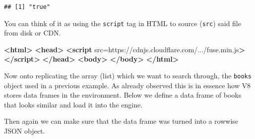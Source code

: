 \documentclass[
]{krantz}
\makeatletter
\newenvironment{Shaded}{\begin{snugshade}}{\end{snugshade}}
\newcommand{\DataTypeTok}[1]{\textcolor[rgb]{0.27,0.27,0.27}{#1}}
\newcommand{\KeywordTok}[1]{\textcolor[rgb]{0.27,0.27,0.27}{\textbf{#1}}}
\newcommand{\NormalTok}[1]{#1}
\newcommand{\OperatorTok}[1]{\textcolor[rgb]{0.43,0.43,0.43}{\textbf{#1}}}
\newcommand{\OtherTok}[1]{\textcolor[rgb]{0.37,0.37,0.37}{#1}}
\newcommand{\StringTok}[1]{\textcolor[rgb]{0.5,0.5,0.5}{#1}}
\newenvironment{kframe}{%
\medskip{}
\setlength{\fboxsep}{.8em}
 \def\at@end@of@kframe{}%
 \ifinner\ifhmode%
  \def\at@end@of@kframe{\end{minipage}}%
  \begin{minipage}{\columnwidth}%
 \fi\fi%
 \def\FrameCommand##1{\hskip\@totalleftmargin \hskip-\fboxsep
 \colorbox{shadecolor}{##1}\hskip-\fboxsep
     \hskip-\linewidth \hskip-\@totalleftmargin \hskip\columnwidth}%
 \MakeFramed {\advance\hsize-\width
   \@totalleftmargin\z@ \linewidth\hsize
   \@setminipage}}%
 {\par\unskip\endMakeFramed%
 \at@end@of@kframe}
\renewenvironment{Shaded}{\begin{kframe}}{\end{kframe}}
\makeatother
\begin{document}
\begin{verbatim}
## [1] "true"
\end{verbatim}

You can think of it as using the \texttt{script} tag in HTML to source (\texttt{src}) said file from disk or CDN.

\begin{Shaded}
\begin{Highlighting}[]
\KeywordTok{\textless{}html\textgreater{}}
  \KeywordTok{\textless{}head\textgreater{}}
    \KeywordTok{\textless{}script} 
\OtherTok{      src=}\StringTok{\textquotesingle{}https://cdnjs.cloudflare.com/.../fuse.min.js\textquotesingle{}}\KeywordTok{\textgreater{}}
    \KeywordTok{\textless{}/script\textgreater{}}
  \KeywordTok{\textless{}/head\textgreater{}}
  \KeywordTok{\textless{}body\textgreater{}}
  \KeywordTok{\textless{}/body\textgreater{}}
\KeywordTok{\textless{}/html\textgreater{}}
\end{Highlighting}
\end{Shaded}

Now onto replicating the array (list) which we want to search through, the \texttt{books} object used in a previous example. As already observed this is in essence how V8 stores data frames in the environment. Below we define a data frame of books that looks similar and load it into the engine.

\begin{Shaded}
\end{Shaded}

Then again we can make sure that the data frame was turned into a rowwise JSON object.

\begin{Shaded}
\end{Shaded}
\end{document}
